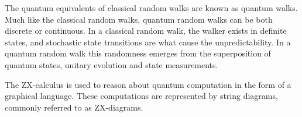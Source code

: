 The quantum equivalents of classical random walks are known as quantum walks. 
Much like the classical random walks, quantum random walks can be both discrete or continuous. 
In a classical random walk, the walker exists in definite states, and stochastic state transitions are what cause the unpredictability. In a quantum random walk this randomness emerges from the superposition of quantum states, unitary evolution and state measurements.

The ZX-calculus is used to reason about quantum computation in the form of a graphical language. These computations are represented by string diagrams, commonly referred to as ZX-diagrams.

